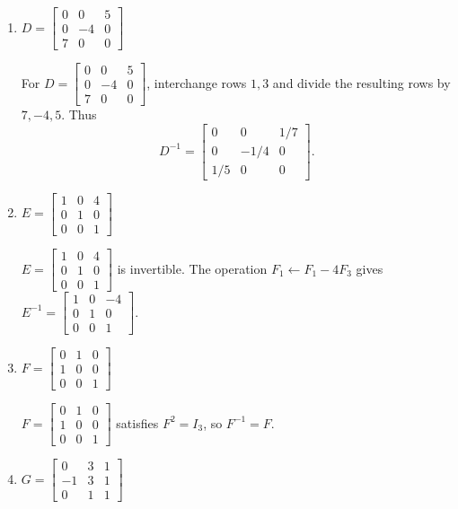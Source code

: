 \begin{enumerate}[label=\alph*)]
\item $D=\begin{bmatrix}0&0&5\\0&-4&0\\7&0&0\end{bmatrix}$

\begin{answer}
For $D=\begin{bmatrix}0&0&5\\0&-4&0\\7&0&0\end{bmatrix}$,
interchange rows $1,3$ and divide the resulting rows by $7,-4,5$.
Thus
\[
 D^{-1}=\begin{bmatrix}0&0&1/7\\0&-1/4&0\\1/5&0&0\end{bmatrix}.
\]
\end{answer}

\item $E=\begin{bmatrix}1&0&4\\0&1&0\\0&0&1\end{bmatrix}$

\begin{answer}
$E=\begin{bmatrix}1&0&4\\0&1&0\\0&0&1\end{bmatrix}$ is invertible.
The operation $F_1\gets F_1-4F_3$ gives
$E^{-1}=\begin{bmatrix}1&0&-4\\0&1&0\\0&0&1\end{bmatrix}$.
\end{answer}

\item $F=\begin{bmatrix}0&1&0\\1&0&0\\0&0&1\end{bmatrix}$

\begin{answer}
$F=\begin{bmatrix}0&1&0\\1&0&0\\0&0&1\end{bmatrix}$ satisfies
$F^2=I_3$, so $F^{-1}=F$.
\end{answer}

\item $G=\begin{bmatrix}0&3&1\\-1&3&1\\0&1&1\end{bmatrix}$


\end{enumerate}
